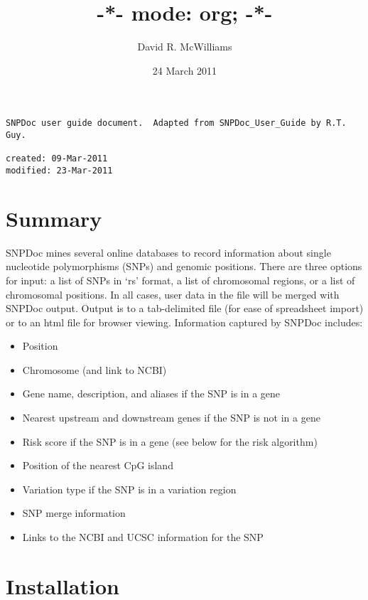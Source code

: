 \documentclass[11pt]{article}
\begin{document}
\title{-*- mode: org; -*-}
\author{David R. McWilliams}
\date{24 March 2011}
\maketitle

\setcounter{tocdepth}{3}
\tableofcontents
\vspace*{1cm}

\begin{verbatim}
SNPDoc user guide document.  Adapted from SNPDoc_User_Guide by R.T. Guy.

created: 09-Mar-2011
modified: 23-Mar-2011
\end{verbatim}


\section{Summary}
\label{sec-1}


  SNPDoc mines several online databases to record information about single
  nucleotide polymorphisms (SNPs) and genomic positions.  There are three
  options for input: a list of SNPs in `rs' format, a list of chromosomal
  regions, or a list of chromosomal positions.  In all cases, user data in the
  file will be merged with SNPDoc output.  Output is to a tab-delimited file
  (for ease of spreadsheet import) or to an html file for browser viewing.
  Information captured by SNPDoc includes:

\begin{itemize}
\item Position
\item Chromosome (and link to NCBI)
\item Gene name, description, and aliases if the SNP is in a gene
\item Nearest upstream and downstream genes if the SNP is not in a gene
\item Risk score if the SNP is in a gene (see below for the risk algorithm)
\item Position of the nearest CpG island
\item Variation type if the SNP is in a variation region
\item SNP merge information
\item Links to the NCBI and UCSC information for the SNP
\end{itemize}
\section{Installation}
\label{sec-2}
\end{document}
